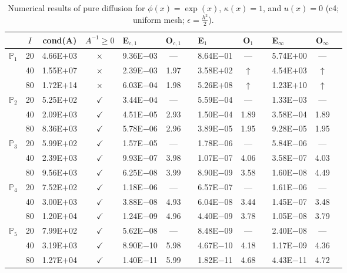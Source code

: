 \begin{table}[H]
\centering
\caption{Numerical results of pure diffusion for $\phi(x)=\exp(x)$, $\kappa(x)=1$, and $u(x)=0$ (c4; uniform mesh; $\epsilon=\frac{h^2}{2}$).}
\begin{tabular}{@{}l c c c l c c l c c l c c@{}}
\toprule
 & $I$ & cond(A) & $A^{-1}\geq 0$ &  E$_{c,1}$ & O$_{c,1}$ && E$_1$ & O$_1$ && E$_{\infty}$ & O$_{\infty}$\\
\midrule
\multirow{3}{*}{$\mathbb{P}_{1}$}
 & 20 & 4.66E$+$03 & $\times$ & 9.36E$-$03 & --- && 8.64E$-$01 & --- && 5.74E$+$00 & ---\\
 & 40 & 1.55E$+$07 & $\times$ & 2.39E$-$03 & 1.97 && 3.58E$+$02 & $\uparrow$ && 4.54E$+$03 & $\uparrow$\\
 & 80 & 1.72E$+$14 & $\times$ & 6.03E$-$04 & 1.98 && 5.26E$+$08 & $\uparrow$ && 1.23E$+$10 & $\uparrow$\\
\midrule
\multirow{3}{*}{$\mathbb{P}_{2}$}
 & 20 & 5.25E$+$02 & $\checkmark$ & 3.44E$-$04 & --- && 5.59E$-$04 & --- && 1.33E$-$03 & ---\\
 & 40 & 2.09E$+$03 & $\checkmark$ & 4.51E$-$05 & 2.93 && 1.50E$-$04 & 1.89 && 3.58E$-$04 & 1.89\\
 & 80 & 8.36E$+$03 & $\checkmark$ & 5.78E$-$06 & 2.96 && 3.89E$-$05 & 1.95 && 9.28E$-$05 & 1.95\\
\midrule
\multirow{3}{*}{$\mathbb{P}_{3}$}
 & 20 & 5.99E$+$02 & $\checkmark$ & 1.57E$-$05 & --- && 1.78E$-$06 & --- && 5.84E$-$06 & ---\\
 & 40 & 2.39E$+$03 & $\checkmark$ & 9.93E$-$07 & 3.98 && 1.07E$-$07 & 4.06 && 3.58E$-$07 & 4.03\\
 & 80 & 9.56E$+$03 & $\checkmark$ & 6.25E$-$08 & 3.99 && 8.90E$-$09 & 3.58 && 1.60E$-$08 & 4.49\\
\midrule
\multirow{3}{*}{$\mathbb{P}_{4}$}
 & 20 & 7.52E$+$02 & $\checkmark$ & 1.18E$-$06 & --- && 6.57E$-$07 & --- && 1.61E$-$06 & ---\\
 & 40 & 3.00E$+$03 & $\checkmark$ & 3.88E$-$08 & 4.93 && 6.04E$-$08 & 3.44 && 1.45E$-$07 & 3.48\\
 & 80 & 1.20E$+$04 & $\checkmark$ & 1.24E$-$09 & 4.96 && 4.40E$-$09 & 3.78 && 1.05E$-$08 & 3.79\\
\midrule
\multirow{3}{*}{$\mathbb{P}_{5}$}
 & 20 & 7.99E$+$02 & $\checkmark$ & 5.62E$-$08 & --- && 8.48E$-$09 & --- && 2.40E$-$08 & ---\\
 & 40 & 3.19E$+$03 & $\checkmark$ & 8.90E$-$10 & 5.98 && 4.67E$-$10 & 4.18 && 1.17E$-$09 & 4.36\\
 & 80 & 1.27E$+$04 & $\checkmark$ & 1.40E$-$11 & 5.99 && 1.82E$-$11 & 4.68 && 4.43E$-$11 & 4.72\\
\bottomrule
\end{tabular}
\end{table}